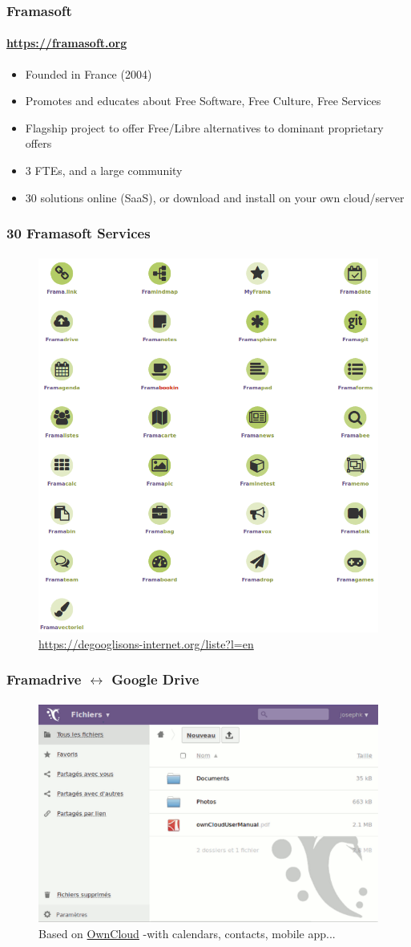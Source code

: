 	\begin{frame}
	\frametitle{Framasoft}
	\framesubtitle{\url{https://framasoft.org}}
		\begin{itemize}
			\item Founded in France (2004)
			\item Promotes and educates about Free Software, Free Culture, Free Services
			\item Flagship project to offer Free/Libre alternatives to dominant proprietary offers
			\item 3 FTEs, and a large community
			\item 30 solutions online (SaaS), or download and install on your own cloud/server
		\end{itemize}
	\end{frame}

	\begin{frame}
	\frametitle{30 Framasoft Services}
	\framesubtitle{}
	        \begin{figure}[h]
                \centering
                \includegraphics[width=.55\textwidth]{../pics/framasoft-solutions}
		\caption{\url{https://degooglisons-internet.org/liste?l=en}}
        	\end{figure}
	\end{frame}

	\begin{frame}
	\frametitle{Framadrive $\leftrightarrow$ Google Drive}
	\framesubtitle{}
	        \begin{figure}[h]
                \centering
                \includegraphics[width=.8\textwidth]{../pics/framadrive}
		\caption{Based on \href{https://owncloud.org/}{OwnCloud} -with calendars, contacts, mobile app...}
        	\end{figure}
	\end{frame}


